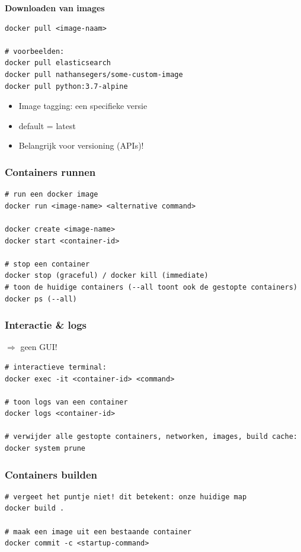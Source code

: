 \documentclass{article}
\begin{document}
\textbf{Downloaden van images}

\begin{verbatim}
docker pull <image-naam>

# voorbeelden:
docker pull elasticsearch
docker pull nathansegers/some-custom-image
docker pull python:3.7-alpine
\end{verbatim}

\begin{itemize}
    \item Image tagging: een specifieke versie
    \item default = latest
    \item Belangrijk voor versioning (APIs)!
\end{itemize}

\subsubsection{Containers runnen}

\begin{verbatim}
# run een docker image
docker run <image-name> <alternative command>

docker create <image-name>
docker start <container-id>

# stop een container
docker stop (graceful) / docker kill (immediate)
# toon de huidige containers (--all toont ook de gestopte containers)
docker ps (--all)
\end{verbatim}

\subsubsection{Interactie \& logs}

$\Rightarrow$ geen GUI!

\begin{verbatim}
# interactieve terminal:
docker exec -it <container-id> <command>

# toon logs van een container
docker logs <container-id>

# verwijder alle gestopte containers, networken, images, build cache:
docker system prune
\end{verbatim}

\subsubsection{Containers builden}

\begin{verbatim}
# vergeet het puntje niet! dit betekent: onze huidige map
docker build .

# maak een image uit een bestaande container
docker commit -c <startup-command>
\end{verbatim}
\end{document}
